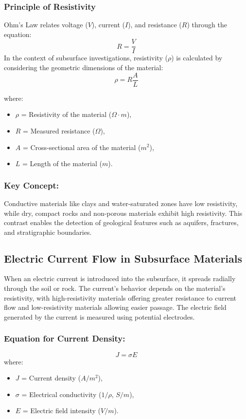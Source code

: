 \documentclass[12pt,a4paper]{report}
\begin{document}
\subsubsection{Principle of Resistivity}
Ohm's Law relates voltage ($V$), current ($I$), and resistance ($R$) through the equation:
\begin{equation}
    R = \frac{V}{I}
\end{equation}
In the context of subsurface investigations, resistivity ($\rho$) is calculated by considering the geometric dimensions of the material:
\begin{equation}
\rho = R \frac{A}{L}
\end{equation}

where:
\begin{itemize}
    \item $\rho$ = Resistivity of the material ($\Omega \cdot m$),
    \item $R$ = Measured resistance ($\Omega$),
    \item $A$ = Cross-sectional area of the material ($m^2$),
    \item $L$ = Length of the material ($m$).
\end{itemize}

\subsubsection{Key Concept:}  
Conductive materials like clays and water-saturated zones have low resistivity, while dry, compact rocks and non-porous materials exhibit high resistivity. This contrast enables the detection of geological features such as aquifers, fractures, and stratigraphic boundaries.

\subsection{Electric Current Flow in Subsurface Materials}
When an electric current is introduced into the subsurface, it spreads radially through the soil or rock. The current's behavior depends on the material's resistivity, with high-resistivity materials offering greater resistance to current flow and low-resistivity materials allowing easier passage. The electric field generated by the current is measured using potential electrodes.

\subsubsection{Equation for Current Density:}
\begin{equation}
J = \sigma E
\end{equation}
where:
\begin{itemize}
    \item $J$ = Current density ($A/m^2$),
    \item $\sigma$ = Electrical conductivity ($1/\rho$, $S/m$),
    \item $E$ = Electric field intensity ($V/m$).
\end{itemize}
\end{document}
